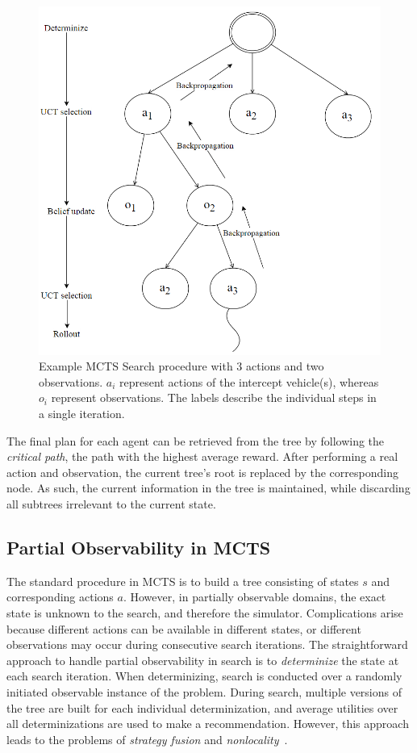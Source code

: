 \documentclass[conference]{IEEEtran}
\begin{document}
\begin{figure}
\begin{center}
 \includegraphics[width=.44\textwidth]{img/searchtree.png}
 \caption{Example MCTS Search procedure with 3 actions and two observations. $a_i$ represent actions of the intercept vehicle(s), whereas $o_i$ represent observations. The labels describe the individual steps in a single iteration.}\label{fig:searchtree}
\end{center}
\end{figure}

The final plan for each agent can be retrieved from the tree by following the \emph{critical path}, \ie the path with the highest average reward. After performing a real action and observation, the current tree's root is replaced by the corresponding node. As such, the current information in the tree is maintained, while discarding all subtrees irrelevant to the current state.

\subsection{Partial Observability in MCTS}
\label{sub:pomcts}

The standard procedure in MCTS is to build a tree consisting of states $s$ and corresponding actions $a$. However, in partially observable domains, the exact state is unknown to the search, and therefore the simulator. Complications arise because different actions can be available in different states, or different observations may occur during consecutive search iterations. The straightforward approach to handle partial observability in search is to \emph{determinize} the state at each search iteration. When determinizing, search is conducted over a randomly initiated observable instance of the problem. During search, multiple versions of the tree are built for each individual determinization, and average utilities over all determinizations are used to make a recommendation. However, this approach leads to the problems of \emph{strategy fusion} and \emph{nonlocality}~\cite{cowling2012information}.
\end{document}
